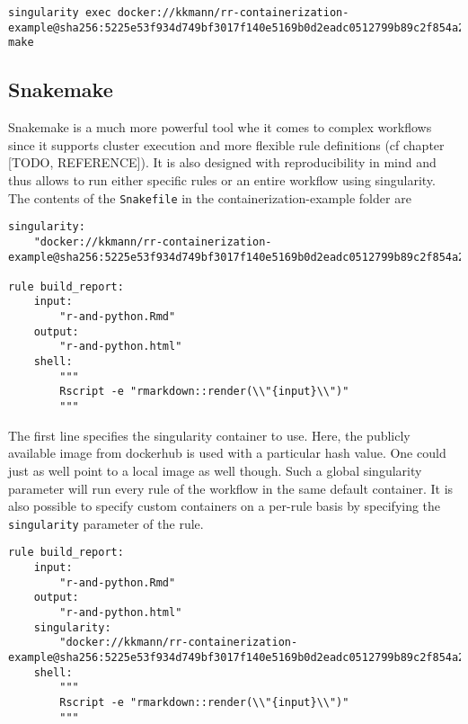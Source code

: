 \documentclass[]{book}
\begin{document}
\begin{verbatim}
singularity exec docker://kkmann/rr-containerization-example@sha256:5225e53f934d749bf3017f140e5169b0d2eadc0512799b89c2f854a2d002d0c4 make
\end{verbatim}

\subsection{Snakemake}\label{snakemake}

Snakemake is a much more powerful tool whe it comes to complex workflows
since it supports cluster execution and more flexible rule definitions
(cf chapter {[}TODO, REFERENCE{]}). It is also designed with
reproducibility in mind and thus allows to run either specific rules or
an entire workflow using singularity. The contents of the
\texttt{Snakefile} in the containerization-example folder are

\begin{verbatim}
singularity:
    "docker://kkmann/rr-containerization-example@sha256:5225e53f934d749bf3017f140e5169b0d2eadc0512799b89c2f854a2d002d0c4"

rule build_report:
    input:
        "r-and-python.Rmd"
    output:
        "r-and-python.html"
    shell:
        """
        Rscript -e "rmarkdown::render(\\"{input}\\")"
        """
\end{verbatim}

The first line specifies the singularity container to use. Here, the
publicly available image from dockerhub is used with a particular hash
value. One could just as well point to a local image as well though.
Such a global singularity parameter will run every rule of the workflow
in the same default container. It is also possible to specify custom
containers on a per-rule basis by specifying the \texttt{singularity}
parameter of the rule.

\begin{verbatim}
rule build_report:
    input:
        "r-and-python.Rmd"
    output:
        "r-and-python.html"
    singularity:
        "docker://kkmann/rr-containerization-example@sha256:5225e53f934d749bf3017f140e5169b0d2eadc0512799b89c2f854a2d002d0c4"
    shell:
        """
        Rscript -e "rmarkdown::render(\\"{input}\\")"
        """
\end{verbatim}
\end{document}
